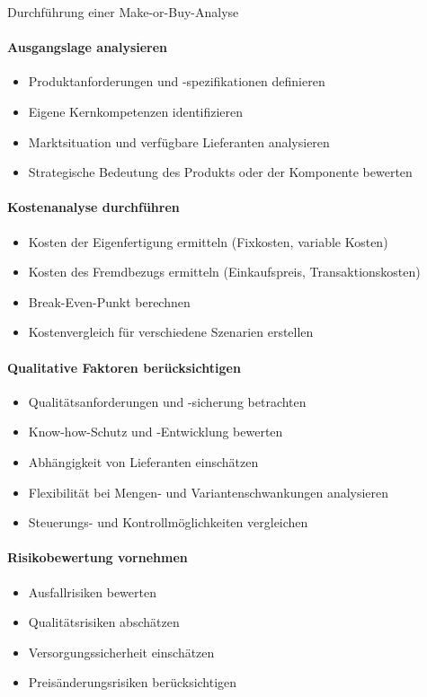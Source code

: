 \begin{KR}{Durchführung einer Make-or-Buy-Analyse}\\
\paragraph{Ausgangslage analysieren}
\begin{itemize}
    \item Produktanforderungen und -spezifikationen definieren
    \item Eigene Kernkompetenzen identifizieren
    \item Marktsituation und verfügbare Lieferanten analysieren
    \item Strategische Bedeutung des Produkts oder der Komponente bewerten
\end{itemize}

\paragraph{Kostenanalyse durchführen}
\begin{itemize}
    \item Kosten der Eigenfertigung ermitteln (Fixkosten, variable Kosten)
    \item Kosten des Fremdbezugs ermitteln (Einkaufspreis, Transaktionskosten)
    \item Break-Even-Punkt berechnen
    \item Kostenvergleich für verschiedene Szenarien erstellen
\end{itemize}

\paragraph{Qualitative Faktoren berücksichtigen}
\begin{itemize}
    \item Qualitätsanforderungen und -sicherung betrachten
    \item Know-how-Schutz und -Entwicklung bewerten
    \item Abhängigkeit von Lieferanten einschätzen
    \item Flexibilität bei Mengen- und Variantenschwankungen analysieren
    \item Steuerungs- und Kontrollmöglichkeiten vergleichen
\end{itemize}

\paragraph{Risikobewertung vornehmen}
\begin{itemize}
    \item Ausfallrisiken bewerten
    \item Qualitätsrisiken abschätzen
    \item Versorgungssicherheit einschätzen
    \item Preisänderungsrisiken berücksichtigen
\end{itemize}


\end{KR}
